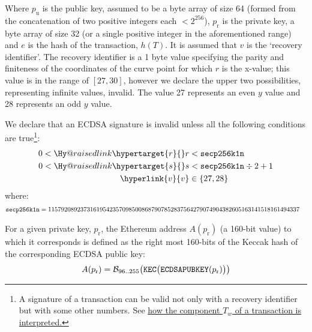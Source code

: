 \documentclass[9pt,oneside]{amsart}
\makeatletter
\newcommand{\linkdest}[1]{\Hy@raisedlink{\hypertarget{#1}{}}}
\makeatother
\begin{document}
Where $p_{\mathrm{u}}$ is the public key, assumed to be a byte array of size 64 (formed from the concatenation of two positive integers each $< 2^{256}$), $p_{\mathrm{r}}$ is the private key, a byte array of size 32 (or a single positive integer in the aforementioned range) and $e$ is the hash of the transaction, \hyperlink{h_of_T}{$h(T)$}. It is assumed that \hypertarget{v}{}$v$ is the `recovery identifier'. The recovery identifier is a 1 byte value specifying the parity and finiteness of the coordinates of the curve point for which $r$ is the x-value; this value is in the range of $[27, 30]$, however we declare the upper two possibilities, representing infinite values, invalid. The value 27 represents an even $y$ value and 28 represents an odd $y$ value.

\newcommand{\slimit}{\ensuremath{\text{s-limit}}}

\linkdest{invalidsig}We declare that an ECDSA signature is invalid unless all the following conditions are true\footnote{A signature of a transaction can be valid not only with a recovery identifier but with some other numbers.  See \hyperlink{T__w}{how the component $T_w$ of a transaction is interpreted.}}:
\begin{align}
0 < \linkdest{r}{r} &< \mathtt{\tiny secp256k1n} \\
0 < \linkdest{s}{s} &< \mathtt{\tiny secp256k1n} \div 2 + 1 \\
\hyperlink{v}{v} &\in \{27,28\}
\end{align}
where:
\begin{align}
\mathtt{\tiny secp256k1n} &= 115792089237316195423570985008687907852837564279074904382605163141518161494337
\end{align}

For a given private key, $p_{\mathrm{r}}$, the Ethereum address $A(p_{\mathrm{r}})$ (a 160-bit value) to which it corresponds is defined as the right most 160-bits of the Keccak hash of the corresponding ECDSA public key:
\begin{equation}
A(p_{\mathrm{r}}) = \mathcal{B}_{96..255}\big(\mathtt{\tiny KEC}\big( \mathtt{\small ECDSAPUBKEY}(p_{\mathrm{r}}) \big) \big)
\end{equation}
\end{document}
